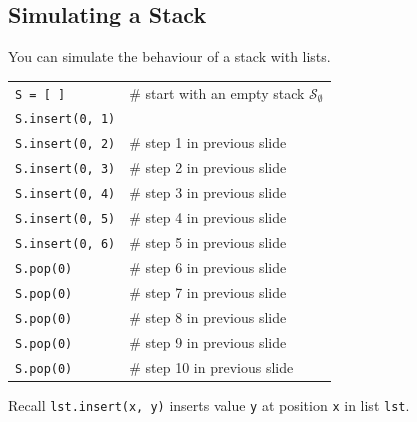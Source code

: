 \documentclass[t,handout,9pt]{beamer}
\begin{document}
\subsection{Simulating a Stack}
\begin{frame}
\vfill
You can simulate the behaviour of a stack with lists.
\vfill
\begin{table}[]
\begin{flushleft}
\begin{tabular}{ll}
\texttt{S = [ ]} &  \# start with an empty stack $\mathcal{S}_\emptyset$\\
\texttt{S.insert(0, 1)} &  \\
\texttt{S.insert(0, 2)} &  \# step 1 in previous slide\\
\texttt{S.insert(0, 3)} &  \# step 2 in previous slide\\
\texttt{S.insert(0, 4)} &  \# step 3 in previous slide\\
\texttt{S.insert(0, 5)} &  \# step 4 in previous slide\\
\texttt{S.insert(0, 6)} &  \# step 5 in previous slide\\
\texttt{S.pop(0)} &  \# step 6 in previous slide\\
\texttt{S.pop(0)} &  \# step 7 in previous slide\\
\texttt{S.pop(0)} &  \# step 8 in previous slide\\
\texttt{S.pop(0)} &  \# step 9 in previous slide\\
\texttt{S.pop(0)} &  \# step 10 in previous slide\\
\end{tabular}
\end{flushleft}
\end{table}
\vfill
\begin{block}{Recall}
\texttt{lst.insert(x, y)} inserts value \texttt{y} at position \texttt{x} in list \texttt{lst}.
\end{block}
\vfill
\end{frame}
%
\end{document}
